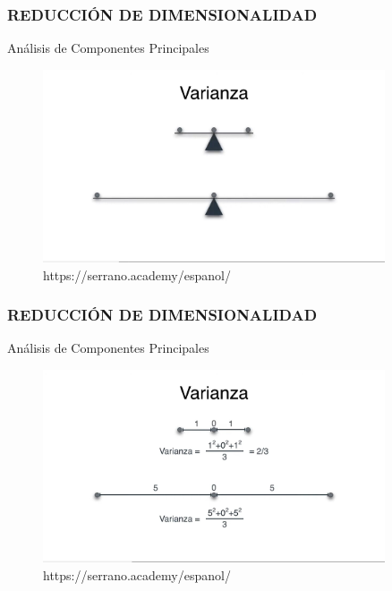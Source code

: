 \documentclass{beamer}
\begin{document}
\begin{frame}
	\frametitle{REDUCCIÓN DE DIMENSIONALIDAD}
	\begin{block}{Análisis de Componentes Principales}	
		\begin{figure}
			\includegraphics[width=0.9\textwidth]{PCA/IMG_3546.jpg}
			\caption{https://serrano.academy/espanol/}
		\end{figure}
	\end{block}
\end{frame}


\begin{frame}
	\frametitle{REDUCCIÓN DE DIMENSIONALIDAD}
	\begin{block}{Análisis de Componentes Principales}	
		\begin{figure}
			\includegraphics[width=0.9\textwidth]{PCA/IMG_3547.jpg}
			\caption{https://serrano.academy/espanol/}
		\end{figure}
	\end{block}
\end{frame}
\end{document}
